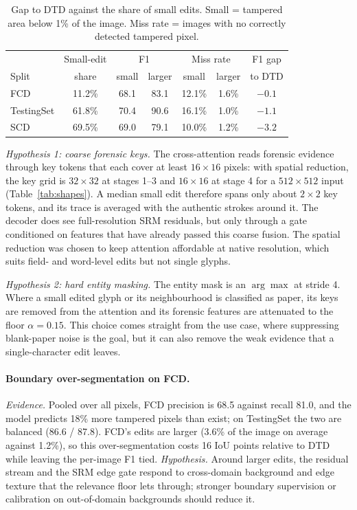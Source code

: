 \documentclass[11pt,a4paper]{article}
\begin{document}
\begin{table}[!htbp]
\centering
\caption{Gap to DTD against the share of small edits. Small = tampered area below 1\% of the
image. Miss rate = images with no correctly detected tampered pixel.}
\label{tab:gapshare}
\small
\begin{tabular}{@{}lcccccc@{}}
\toprule
 & Small-edit & \multicolumn{2}{c}{F1} & \multicolumn{2}{c}{Miss rate} & F1 gap \\
Split & share & small & larger & small & larger & to DTD \\
\midrule
FCD        & 11.2\% & 68.1 & 83.1 & 12.1\% & 1.6\% & $-0.1$ \\
TestingSet & 61.8\% & 70.4 & 90.6 & 16.1\% & 1.0\% & $-1.1$ \\
SCD        & 69.5\% & 69.0 & 79.1 & 10.0\% & 1.2\% & $-3.2$ \\
\bottomrule
\end{tabular}
\end{table}

\emph{Hypothesis 1: coarse forensic keys.} The cross-attention reads forensic evidence through key
tokens that each cover at least $16\times16$ pixels: with spatial reduction, the key grid is
$32\times32$ at stages 1--3 and $16\times16$ at stage 4 for a $512\times512$ input
(Table~\ref{tab:shapes}). A median small edit therefore spans only about $2\times2$ key tokens,
and its trace is averaged with the authentic strokes around it. The decoder does see
full-resolution SRM residuals, but only through a gate conditioned on features that have
already passed this coarse fusion. The spatial reduction was chosen to keep attention affordable
at native resolution, which suits field- and word-level edits but not single glyphs.

\emph{Hypothesis 2: hard entity masking.} The entity mask is an $\arg\max$ at stride 4. Where a
small edited glyph or its neighbourhood is classified as paper, its keys are removed from the
attention and its forensic features are attenuated to the floor $\alpha=0.15$. This choice comes
straight from the use case, where suppressing blank-paper noise is the goal, but it can also
remove the weak evidence that a single-character edit leaves.

\paragraph{Boundary over-segmentation on FCD.}
\emph{Evidence.} Pooled over all pixels, FCD precision is 68.5 against recall 81.0, and the model
predicts 18\% more tampered pixels than exist; on TestingSet the two are balanced (86.6 / 87.8).
FCD's edits are larger (3.6\% of the image on average against 1.2\%), so this over-segmentation
costs 16 IoU points relative to DTD while leaving the per-image F1 tied.
\emph{Hypothesis.} Around larger edits, the residual stream and the SRM edge gate respond to
cross-domain background and edge texture that the relevance floor lets through; stronger
boundary supervision or calibration on out-of-domain backgrounds should reduce it.
\end{document}
